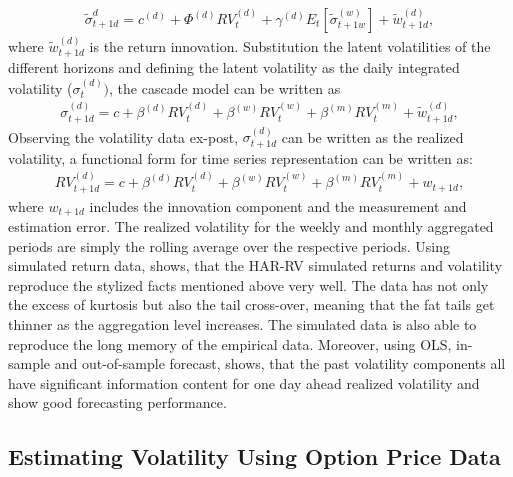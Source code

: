 \begin{align*}
\tilde{\sigma}_{t+1d}^{d} = c^{(d)} + \Phi^{(d)} RV_{t}^{(d)} + \gamma^{(d)} E_{t}[\tilde{\sigma}_{t+1w}^{(w)}] + \tilde{w}_{t+1d}^{(d)},
\end{align*}
where $\tilde{w}_{t+1d}^{(d)}$ is the return innovation. Substitution the latent volatilities of the different horizons and defining the latent volatility as the daily integrated volatility ($\sigma_{t}^{(d)})$, the cascade model can be written as
\begin{align}\label{eq:cascade-model}
\sigma_{t+1d}^{(d)} = c + \beta^{(d)} RV_{t}^{(d)} + \beta^{(w)} RV_{t}^{(w)} + \beta^{(m)} RV_{t}^{(m)} + \tilde{w}_{t+1d}^{(d)},
\end{align}
Observing the volatility data ex-post, $\sigma_{t+1d}^{(d)}$ can be written as the realized volatility, a functional form for time series representation can be written as:
\begin{align}\label{eq:time-series-model}
RV_{t+1d}^{(d)} = c + \beta^{(d)} RV_{t}^{(d)} + \beta^{(w)} RV_{t}^{(w)} + \beta^{(m)} RV_{t}^{(m)} + w_{t+1d} ,
\end{align}
where $w_{t+1d}$ includes the innovation component and the measurement and estimation error. The realized volatility for the weekly and monthly aggregated periods are simply the rolling average over the respective periods.
Using simulated return data, \textcite{corsi2009} shows, that the HAR-RV simulated returns and volatility reproduce the stylized facts mentioned above very well. The data has not only the excess of kurtosis but also the tail cross-over, meaning that the fat tails get thinner as the aggregation level increases. The simulated data is also able to reproduce the long memory of the empirical data. Moreover, using OLS, in-sample and out-of-sample forecast, \textcite{corsi2009} shows, that the past volatility components all have significant information content for one day ahead realized volatility and show good forecasting performance.

\subsection{Estimating Volatility Using Option Price Data}
